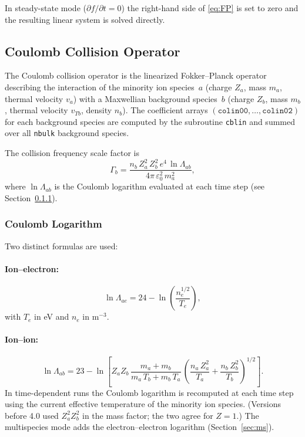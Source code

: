 \documentclass[11pt,a4paper]{article}
\begin{document}
In steady-state mode ($\partial f/\partial t = 0$) the right-hand side of
\eqref{eq:FP} is set to zero and the resulting linear system is solved
directly.

\subsection{Coulomb Collision Operator}

The Coulomb collision operator is the linearized Fokker--Planck operator
describing the interaction of the minority ion species~$a$ (charge $Z_a$,
mass $m_a$, thermal velocity $v_a$) with a Maxwellian background species~$b$
(charge $Z_b$, mass $m_b$, thermal velocity $v_{Tb}$, density $n_b$).
The coefficient arrays $(\texttt{colin00}, \ldots, \texttt{colin02})$ for
each background species are computed by the subroutine \texttt{cblin} and
summed over all \texttt{nbulk} background species.

The collision frequency scale factor is
\begin{equation}
  \Gamma_b = \frac{n_b\,Z_a^2\,Z_b^2\,e^4\,\ln\Lambda_{ab}}
                  {4\pi\,\varepsilon_0^2\,m_a^2},
\end{equation}
where $\ln\Lambda_{ab}$ is the Coulomb logarithm evaluated at each time step
(see Section~\ref{sec:coulomb_log}).

\subsubsection{Coulomb Logarithm}\label{sec:coulomb_log}

Two distinct formulas are used:

\paragraph{Ion--electron:}
\begin{equation}
  \ln\Lambda_{ae} = 24 - \ln\!\left(\frac{n_e^{1/2}}{T_e}\right),
\end{equation}
with $T_e$ in eV and $n_e$ in m$^{-3}$.

\paragraph{Ion--ion:}
\begin{equation}
  \ln\Lambda_{ab} = 23 - \ln\!\left[
    Z_a Z_b\,\frac{m_a+m_b}{m_a\,T_b + m_b\,T_a}\,
    \left(\frac{n_a\,Z_a^2}{T_a}+\frac{n_b\,Z_b^2}{T_b}\right)^{1/2}
  \right].
\end{equation}
In time-dependent runs the Coulomb logarithm is recomputed at each time step
using the current effective temperature of the minority ion species.  (Versions before 4.0 used
$Z_a^2Z_b^2$ in the mass factor; the two agree for $Z=1$.)  The multispecies mode adds the
electron--electron logarithm (Section~\ref{sec:ms}).
\end{document}
